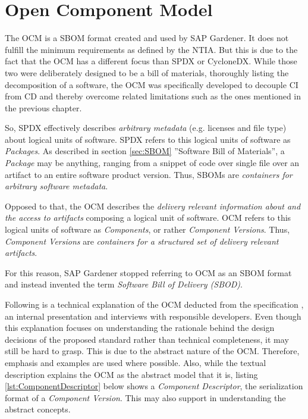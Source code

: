 \section{Open Component Model} \label{sec:Open Component Model}
The OCM is a SBOM format created and used by SAP Gardener. It does not fulfill the minimum requirements as defined by the NTIA. But this is due to the fact that the OCM has a different focus than SPDX or CycloneDX. While those two were deliberately designed to be a bill of materials, thoroughly listing the decomposition of a software, the OCM was specifically developed to decouple CI from CD and thereby overcome related limitations such as the ones mentioned in the previous chapter.\par 
So, SPDX effectively describes \emph{arbitrary metadata} (e.g. licenses and file type) about logical units of software. SPDX refers to this logical units of software as \emph{Packages}. As described in section \ref{sec:SBOM} ''Software Bill of Materials'', a \emph{Package} may be anything, ranging from a snippet of code over single file over an artifact to an entire software product version. Thus, SBOMs are \emph{containers for arbitrary software metadata}.\par
Opposed to that, the OCM describes the \emph{delivery relevant information about and the access to artifacts} composing a logical unit of software. OCM refers to this logical units of software as \emph{Components}, or rather \emph{Component Versions}. Thus, \emph{Component Versions} are  \emph{containers for a structured set of delivery relevant artifacts}.\par 
For this reason, SAP Gardener stopped referring to OCM as an SBOM format and instead invented the term \emph{Software Bill of Delivery (SBOD)}.\par
Following is a technical explanation of the OCM deducted from the specification \cite{OCMSpec}, an internal presentation \cite{OCMInternalPresentation} and interviews with responsible developers. Even though this explanation focuses on understanding the rationale behind the design decisions of the proposed standard rather than technical completeness, it may still be hard to grasp. This is due to the abstract nature of the OCM. Therefore, emphasis and examples are used where possible. Also, while the textual description explains the OCM as the abstract model that it is, listing \ref{lst:ComponentDescriptor} below shows a \emph{Component Descriptor}, the serialization format of a \emph{Component Version}. This may also support in understanding the abstract concepts.

